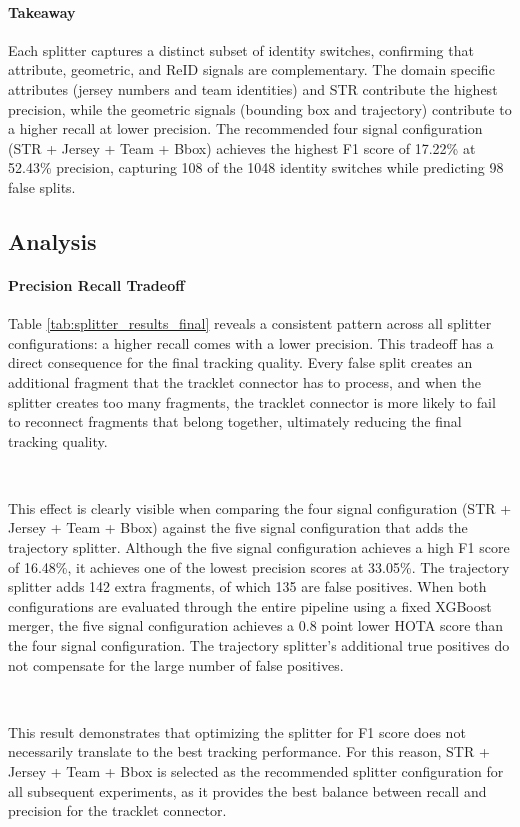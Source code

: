 \paragraph{Takeaway}
Each splitter captures a distinct subset of identity switches, confirming that attribute, geometric, and ReID signals are complementary. The domain specific attributes (jersey numbers and team identities) and STR contribute the highest precision, while the geometric signals (bounding box and trajectory) contribute to a higher recall at lower precision. The recommended four signal configuration (STR + Jersey + Team + Bbox) achieves the highest F1 score of 17.22\% at 52.43\% precision, capturing 108 of the 1048 identity switches while predicting 98 false splits.


\subsection{Analysis}
\paragraph{Precision Recall Tradeoff}
Table \ref{tab:splitter_results_final} reveals a consistent pattern across all splitter configurations: a higher recall comes with a lower precision. This tradeoff has a direct consequence for the final tracking quality. Every false split creates an additional fragment that the tracklet connector has to process, and when the splitter creates too many fragments, the tracklet connector is more likely to fail to reconnect fragments that belong together, ultimately reducing the final tracking quality.

\

This effect is clearly visible when comparing the four signal configuration (STR + Jersey + Team + Bbox) against the five signal configuration that adds the trajectory splitter. Although the five signal configuration achieves a high F1 score of 16.48\%, it achieves one of the lowest precision scores at 33.05\%. The trajectory splitter adds 142 extra fragments, of which 135 are false positives. When both configurations are evaluated through the entire pipeline using a fixed XGBoost merger, the five signal configuration achieves a 0.8 point lower HOTA score than the four signal configuration. The trajectory splitter's additional true positives do not compensate for the large number of false positives.

\

This result demonstrates that optimizing the splitter for F1 score does not necessarily translate to the best tracking performance. For this reason, STR + Jersey + Team + Bbox is selected as the recommended splitter configuration for all subsequent experiments, as it provides the best balance between recall and precision for the tracklet connector.


